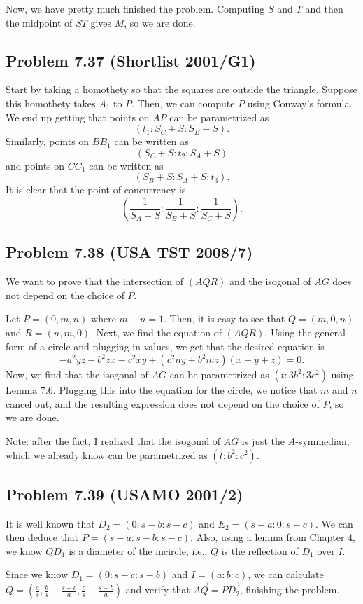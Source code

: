 \documentclass{scrartcl}
\begin{document}
Now, we have pretty much finished the problem. Computing $S$ and $T$ and then the midpoint of $ST$ gives $M$, so we are done.
\subsection*{Problem 7.37 (Shortlist 2001/G1)}
Start by taking a homothety so that the squares are outside the triangle. Suppose this homothety takes $A_1$ to $P$. Then, we can compute $P$ using Conway's formula. We end up getting that points on $AP$ can be parametrized as
\[ (t_1 : S_C + S : S_B + S). \]
Similarly, points on $BB_1$ can be written as
\[ (S_C + S : t_2 : S_A + S) \]
and points on $CC_1$ can be written as
\[ (S_B + S : S_A + S : t_3). \]
It is clear that the point of concurrency is
\[ \left(\frac{1}{S_A + S} : \frac{1}{S_B + S} : \frac{1}{S_C + S}\right). \]
\subsection*{Problem 7.38 (USA TST 2008/7)}
We want to prove that the intersection of $(AQR)$ and the isogonal of $AG$ does not depend on the choice of $P$.

Let $P = (0, m, n)$ where $m + n = 1$. Then, it is easy to see that $Q = (m, 0, n)$ and $R = (n, m, 0)$.
Next, we find the equation of $(AQR)$. Using the general form of a circle and plugging in values, we get
that the desired equation is
\[ -a^2yz - b^2zx - c^2xy + (c^2ny + b^2mz)(x + y + z) = 0. \]
Now, we find that the isogonal of $AG$ can be parametrized as $(t : 3b^2 : 3c^2)$ using Lemma 7.6. Plugging this
into the equation for the circle, we notice that $m$ and $n$ cancel out, and the resulting expression does not
depend on the choice of $P$, so we are done.

Note: after the fact, I realized that the isogonal of $AG$ is just the $A$-symmedian, which we already know can be parametrized as $(t : b^2 : c^2)$.
\subsection*{Problem 7.39 (USAMO 2001/2)}
It is well known that $D_2 = (0 : s-b : s-c)$ and $E_2 = (s-a : 0 : s-c)$. We can then deduce that
$P = (s-a : s-b : s-c)$. Also, using a lemma from Chapter 4, we know $QD_1$ is a diameter of the incircle, i.e., $Q$ is the reflection of $D_1$ over $I$.

Since we know $D_1 = (0 : s-c : s-b)$ and $I = (a : b : c)$, we can calculate $Q = \left( \frac{a}{s}, \frac{b}{s} - \frac{s-c}{a}, \frac{c}{s} - \frac{s-b}{a} \right)$ and verify that $\overrightarrow{AQ} = \overrightarrow{PD_2}$, finishing the problem.
\end{document}
